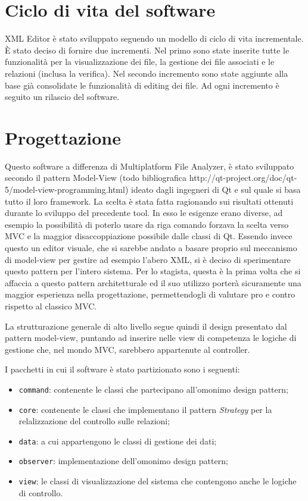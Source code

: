 	\section{Ciclo di vita del software}
		XML Editor è stato sviluppato seguendo un modello di ciclo di vita incrementale. È stato deciso di fornire due incrementi. Nel primo sono state inserite tutte le funzionalità per la visualizzazione dei file, la gestione dei file associati e le relazioni (inclusa la verifica). Nel secondo incremento sono state aggiunte alla base già consolidate le funzionalità di editing dei file. Ad ogni incremento è seguito un rilascio del software.

\section{Progettazione}
	Questo software a differenza di Multiplatform File Analyzer, è stato sviluppato secondo il pattern Model-View (todo bibliografica http://qt-project.org/doc/qt-5/model-view-programming.html) ideato dagli ingegneri di Qt e sul quale si basa tutto il loro framework. La scelta è stata fatta ragionando sui risultati ottenuti durante lo sviluppo del precedente tool. In esso le esigenze erano diverse, ad esempio la possibilità di poterlo usare da riga comando forzava la scelta verso MVC e la maggior disaccoppiazione possibile dalle classi di Qt. Essendo invece questo un editor visuale, che si sarebbe andato a basare proprio sul meccanismo di model-view per gestire ad esempio l'abero XML, si è deciso di sperimentare questo pattern per l'intero sistema. Per lo stagista, questa è la prima volta che si affaccia a questo pattern architetturale ed il suo utilizzo porterà sicuramente una maggior esperienza nella progettazione, permettendogli di valutare pro e contro rispetto al classico MVC.

	La strutturazione generale di alto livello segue quindi il design presentato dal pattern model-view, puntando ad inserire nelle view di competenza le logiche di gestione che, nel mondo MVC, sarebbero appartenute al controller.
	
	I pacchetti in cui il software è stato partizionato sono i seguenti: 
	\begin{itemize}
		\item \texttt{command}: contenente le classi che partecipano all'omonimo design pattern;
		\item\texttt{core}: contenente le classi che implementano il pattern \textit{Strategy} per la relalizzazione del controllo sulle relazioni;
		\item\texttt{data}: a cui appartengono le classi di gestione dei dati;
		\item\texttt{observer}: implementazione dell'omonimo design pattern;
		\item\texttt{view}: le classi di visualizzazione del sistema che contengono anche le logiche di controllo.
	\end{itemize}
	
